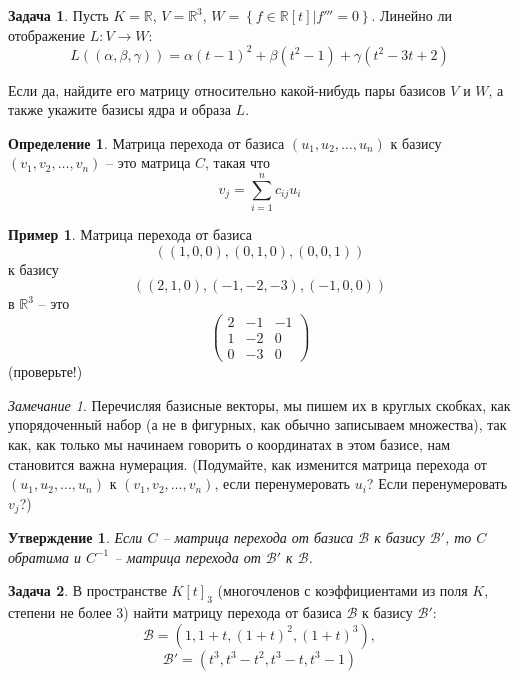 \documentclass[12pt, fleqn]{extarticle}
\newcommand{\real}{\mathbb{R}}
\newcommand{\curvedbrackets}[1]{\left\{#1\right\}}
\newtheorem*{claim}{Утверждение}
\theoremstyle{definition}
\newtheorem{definition}{Определение}
\newtheorem{problem}{Задача}
\newtheorem*{example}{Пример}
\theoremstyle{remark}
\newtheorem*{remark}{Замечание}
\begin{document}
\begin{problem} 
Пусть $K = \real$, 
$V = \real^{3}$, $W = \curvedbrackets{f \in \real[t] \vert f''' = 0}$.
Линейно ли отображение $L: V \rightarrow W$:
$$L((\alpha, \beta, \gamma)) =
 \alpha(t - 1)^{2} + \beta(t^{2} - 1) + \gamma(t^{2} - 3t + 2)$$

Если да, найдите его матрицу относительно какой-нибудь
пары базисов $V$ и $W$, а также укажите базисы ядра и образа $L$.
\end{problem}

\begin{definition}
Матрица перехода от базиса $(u_{1}, u_{2}, \ldots, u_{n})$
к базису $(v_{1}, v_{2}, \ldots, v_{n})$ -- это матрица $C$,
такая что
$$v_{j} = \sum\limits_{i = 1}^{n}c_{ij}u_{i}$$
\end{definition}

\begin{example}
Матрица перехода от базиса  $$((1, 0, 0), (0, 1, 0), (0, 0, 1))$$
к базису
$$((2, 1, 0), (-1, -2, -3), (-1, 0, 0))$$
в $\real^{3}$  -- это
$$\left( \begin{array}{ccc}
2 & -1 & -1\\
1 & -2 & 0\\
0 & -3 & 0 \end{array} \right)$$
(проверьте!)
\end{example}

\begin{remark}
Перечисляя базисные векторы, мы пишем их в круглых скобках,
как упорядоченный набор (а не в фигурных, как обычно записываем множества),
так как, как только мы начинаем говорить о координатах 
в этом базисе, нам становится важна нумерация.
(Подумайте, как изменится матрица перехода от $(u_{1}, u_{2}, \ldots, u_{n})$
к $(v_{1}, v_{2}, \ldots, v_{n})$, если перенумеровать $u_i$? Если перенумеровать $v_j$?)
\end{remark}

\begin{claim}
Если $C$ -- матрица перехода от базиса $\mathcal{B}$ к базису $\mathcal{B'}$, 
то $C$ обратима и $C^{-1}$ -- матрица перехода от $\mathcal{B'}$ к $\mathcal{B}$. 
\end{claim}

\begin{problem}
В пространстве $K[t]_3$ (многочленов с коэффициентами из поля $K$, степени не более 3)
найти матрицу перехода от базиса $\mathcal{B}$
к базису $\mathcal{B'}$:
$$\mathcal{B} = (1, 1 + t, (1 + t)^{2} , (1 + t)^{3}),$$
$$\mathcal{B'} = (t^{3} , t^{3} - t^{2} , t^{3} - t, t^{3} - 1)$$
\end{problem}
\end{document}
